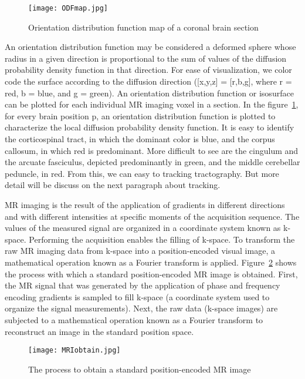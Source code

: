 \begin{figure} 
  \centering 
  \texttt{[image: ODFmap.jpg]}
  \caption{Orientation distribution function map of a coronal brain section}
  \label{Fig:ODF_map}
\end{figure}

An orientation distribution function may be considered a deformed sphere whose radius in a given direction is proportional to the sum of values of the diffusion probability density function in that direction. For ease of visualization, we color code the surface according to the diffusion direction ([x,y,z] = [r,b,g], where r = red, b = blue, and g = green). An orientation distribution function or isosurface can be plotted for each individual MR imaging voxel in a section. In the figure~\ref{Fig:ODF_map}, for every brain position p, an orientation distribution function is plotted to characterize the local diffusion probability density function. It is easy to identify the corticospinal tract, in which the dominant color is blue, and the corpus callosum, in which red is predominant. More difficult to see are the cingulum and the arcuate fasciculus, depicted predominantly in green, and the middle cerebellar peduncle, in red. From this, we can easy to tracking tractography. But more detail will be discuss on the next paragraph about tracking.

MR imaging is the result of the application of gradients in different directions and with different intensities at specific moments of the acquisition sequence. The values of the measured signal are organized in a coordinate system known as k-space. Performing the acquisition enables the filling of k-space. To transform the raw MR imaging data from k-space into a position-encoded visual image, a mathematical operation known as a Fourier transform is applied. Figure~\ref{Fig:MRI_obtain} shows the process with which a standard position-encoded MR image is obtained. First, the MR signal that was generated by the application of phase and frequency encoding gradients is sampled to fill k-space (a coordinate system used to organize the signal measurements). Next, the raw data (k-space images) are subjected to a mathematical operation known as a Fourier transform to reconstruct an image in the standard position space.
\begin{figure} 
  \centering 
  \texttt{[image: MRIobtain.jpg]}
  \caption{The process to obtain a standard position-encoded MR image}
  \label{Fig:MRI_obtain}
\end{figure}

